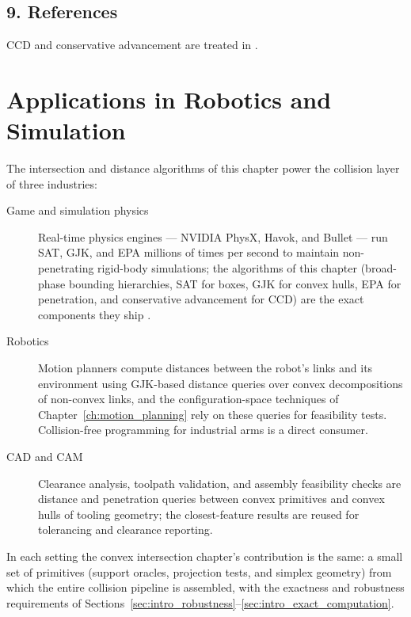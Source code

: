 \subsection{9. References}

CCD and conservative advancement are treated in
\cite{ericson2004,vandenbergen2004}.

\section{Applications in Robotics and Simulation}
\label{sec:convexint_applications}

The intersection and distance algorithms of this chapter power the
collision layer of three industries:

\begin{description}
  \item[Game and simulation physics] Real-time physics engines ---
    NVIDIA PhysX, Havok, and Bullet --- run SAT, GJK, and EPA millions of
    times per second to maintain non-penetrating rigid-body simulations; the
    algorithms of this chapter (broad-phase bounding hierarchies, SAT for
    boxes, GJK for convex hulls, EPA for penetration, and conservative
    advancement for CCD) are the exact components they ship
    \cite{ericson2004,vandenbergen2004}.
  \item[Robotics] Motion planners compute distances between the robot's
    links and its environment using GJK-based distance queries over convex
    decompositions of non-convex links, and the configuration-space
    techniques of Chapter~\ref{ch:motion_planning} rely on these queries
    for feasibility tests. Collision-free programming for industrial arms
    is a direct consumer.
  \item[CAD and CAM] Clearance analysis, toolpath validation, and assembly
    feasibility checks are distance and penetration queries between convex
    primitives and convex hulls of tooling geometry; the closest-feature
    results are reused for tolerancing and clearance reporting.
\end{description}

In each setting the convex intersection chapter's contribution is the
same: a small set of primitives (support oracles, projection tests, and
simplex geometry) from which the entire collision pipeline is assembled,
with the exactness and robustness requirements of
Sections~\ref{sec:intro_robustness}--\ref{sec:intro_exact_computation}.


